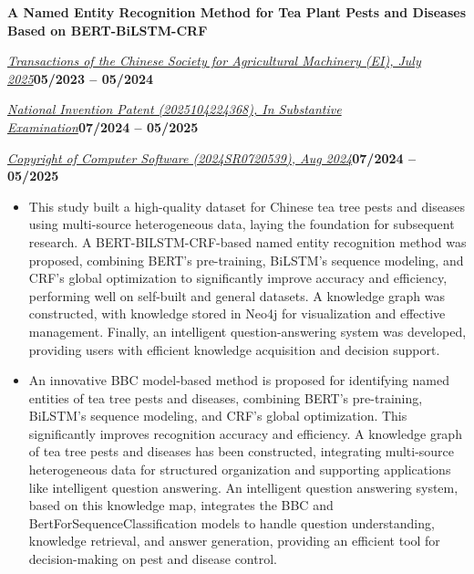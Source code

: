 \documentclass[10pt,a4paper]{article}
\newcommand{\titleline}[1]{\par\noindent\textbf{#1}\par}
\newcommand{\venueline}[2]{\par\noindent\uline{\textit{#1}}\hfill\textbf{#2}\par}
\newenvironment{cvitems}{%
  \begin{itemize}[leftmargin=14.20bp,labelwidth=4.20bp,labelsep=10.00bp,align=left,
    topsep=0bp,itemsep=0bp,parsep=0bp,partopsep=0bp,label={\textbullet}]
}{\end{itemize}}
\begin{document}
\vspace{1.92bp}\titleline{A Named Entity Recognition Method for Tea Plant Pests and Diseases Based on BERT-BiLSTM-CRF}
\venueline{Transactions of the Chinese Society for Agricultural Machinery (EI), July 2025}{05/2023 -- 05/2024}
\venueline{National Invention Patent (2025104224368), In Substantive Examination}{07/2024 -- 05/2025}
\venueline{Copyright of Computer Software (2024SR0720539), Aug 2024}{07/2024 -- 05/2025}
\begin{cvitems}
\item This study built a high-quality dataset for Chinese tea tree pests and diseases using multi-source heterogeneous data, laying the foundation for subsequent research. A BERT-BILSTM-CRF-based named entity recognition method was proposed, combining BERT's pre-training, BiLSTM's sequence modeling, and CRF's global optimization to significantly improve accuracy and efficiency, performing well on self-built and general datasets. A knowledge graph was constructed, with knowledge stored in Neo4j for visualization and effective management. Finally, an intelligent question-answering system was developed, providing users with efficient knowledge acquisition and decision support.
\item An innovative BBC model-based method is proposed for identifying named entities of tea tree pests and diseases, combining BERT's pre-training, BiLSTM's sequence modeling, and CRF's global optimization. This significantly improves recognition accuracy and efficiency. A knowledge graph of tea tree pests and diseases has been constructed, integrating multi-source heterogeneous data for structured organization and supporting applications like intelligent question answering. An intelligent question answering system, based on this knowledge map, integrates the BBC and BertForSequenceClassification models to handle question understanding, knowledge retrieval, and answer generation, providing an efficient tool for decision-making on pest and disease control.
\end{cvitems}
\end{document}
